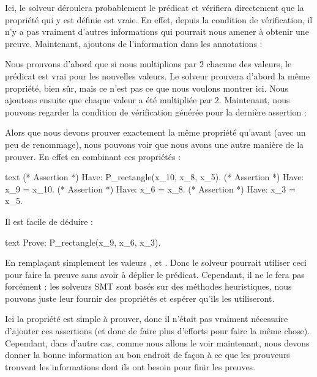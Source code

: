 





Ici, le solveur déroulera probablement le prédicat et vérifiera directement
que la propriété qui y est définie est vraie. En effet, depuis la condition de
vérification, il n'y a pas vraiment d'autres informations qui pourrait nous
amener à obtenir une preuve. Maintenant, ajoutons de l'information dans les
annotations :






Nous prouvons d'abord que si nous multiplions par 2 chacune des valeurs, le
prédicat est vrai pour les nouvelles valeurs. Le solveur prouvera d'abord
la même propriété, bien sûr, mais ce n'est pas ce que nous voulons montrer ici.
Nous ajoutons ensuite que chaque valeur a été multipliée par 2. Maintenant, nous
pouvons regarder la condition de vérification générée pour la dernière assertion :





Alors que nous devons prouver exactement la même propriété qu'avant (avec un peu
de renommage), nous pouvons voir que nous avons une autre manière de la prouver.
En effet en combinant ces propriétés :


\begin{CodeBlock}{text}
(* Assertion *)
Have: P_rectangle(x_10, x_8, x_5).
(* Assertion *)
Have: x_9 = x_10.
(* Assertion *)
Have: x_6 = x_8.
(* Assertion *)
Have: x_3 = x_5.
\end{CodeBlock}


Il est facile de déduire :


\begin{CodeBlock}{text}
Prove: P_rectangle(x_9, x_6, x_3).
\end{CodeBlock}


En remplaçant simplement les valeurs ,  et
. Donc le solveur pourrait utiliser ceci pour faire la preuve
sans avoir à déplier le prédicat. Cependant, il ne le fera pas forcément : les
solveurs SMT sont basés sur des méthodes heuristiques, nous pouvons juste leur
fournir des propriétés et espérer qu'ils les utiliseront.


Ici la propriété est simple à prouver, donc il n'était pas vraiment nécessaire
d'ajouter ces assertions (et donc de faire plus d'efforts pour faire la même
chose). Cependant, dans d'autre cas, comme nous allons le voir maintenant, nous
devons donner la bonne information au bon endroit de façon à ce que les prouveurs
trouvent les informations dont ils ont besoin pour finir les preuves.


